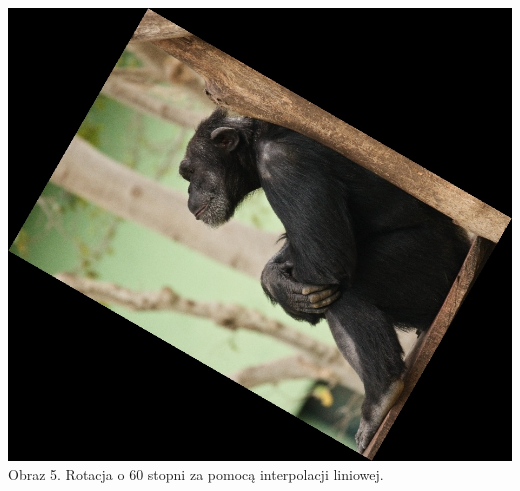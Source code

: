 \documentclass[14pt]{article}
\begin{document}
\begin{center}
    \vspace{2cm}
    \begin{minipage}{7cm}
        \begin{center}
            \vspace{1cm}
            \includegraphics[scale=0.15]{images/rotate_bl_60.jpg}
            \\ \small Obraz 5. Rotacja o 60 stopni za pomocą interpolacji liniowej.
        \end{center}
    \end{minipage}
    \hfill
    \begin{minipage}{7cm}
        \begin{center}

\end{center}
\end{minipage}
\end{center}
\end{document}
